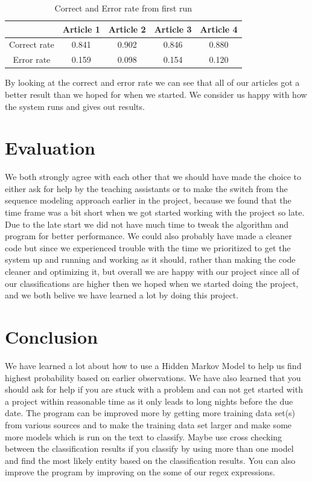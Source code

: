 \documentclass{article}
\begin{document}
\begin{table}[here]
\centering
\begin{tabular}{|c|c|c|c|c|}
\hline
 & Article 1 & Article 2 & Article 3 & Article 4\\
\hline
Correct rate & 0.841 & 0.902 & 0.846 & 0.880  \\
\hline
Error rate & 0.159 & 0.098 & 0.154 & 0.120 \\
\hline
\end{tabular}
\caption{Correct and Error rate from first run}
\label{tab:Correct and Error rate from first run}
\end{table}
By looking at the correct and error rate we can see that all of our articles got a better result than we hoped for when we started. We consider us happy with how the system runs and gives out results.

\section{Evaluation}
We both strongly agree with each other that we should have made the choice to either ask for help by the teaching assistants or to make the switch from the sequence modeling approach earlier in the project, because we found that the time frame was a bit short when we got started working with the project so late. Due to the late start we did not have much time to tweak the algorithm and program for better performance. We could also probably have made a cleaner code but since we experienced trouble with the time we prioritized to get the system up and running and working as it should, rather than making the code cleaner and optimizing it, but overall we are happy with our project since all of our classifications are higher then we hoped when we started doing the project, and we both belive we have learned a lot by doing this project.

\section{Conclusion}
We have learned a lot about how to use a Hidden Markov Model to help us find highest probability based on earlier observations. We have also learned that you should ask for help if you are stuck with a problem and can not get started with a project within reasonable time as it only leads to long nights before the due date. The program can be improved more by getting more training data set(s) from various sources and to make the training data set larger and make some more models which is run on the text to classify. Maybe use cross checking between the classification results if you classify by using more than one model and find the most likely entity based on the classification results. You can also improve the program by improving on the some of our regex expressions.
\end{document}

